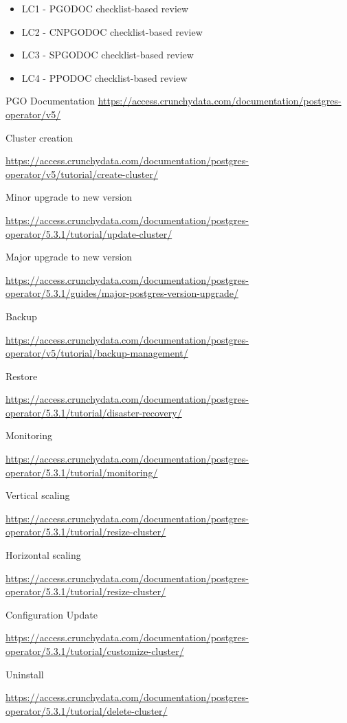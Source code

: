 \begin{itemize}
    \item LC1 - PGODOC checklist-based review
    \item LC2 - CNPGODOC checklist-based review
    \item LC3 - SPGODOC checklist-based review
    \item LC4 - PPODOC checklist-based review
\end{itemize}



PGO
Documentation
\sloppy
\url{https://access.crunchydata.com/documentation/postgres-operator/v5/}

Cluster creation

\url{https://access.crunchydata.com/documentation/postgres-operator/v5/tutorial/create-cluster/}

Minor upgrade to new version

\url{https://access.crunchydata.com/documentation/postgres-operator/5.3.1/tutorial/update-cluster/}

Major upgrade to new version

\url{https://access.crunchydata.com/documentation/postgres-operator/5.3.1/guides/major-postgres-version-upgrade/}

Backup

\url{https://access.crunchydata.com/documentation/postgres-operator/v5/tutorial/backup-management/}

Restore

\url{https://access.crunchydata.com/documentation/postgres-operator/5.3.1/tutorial/disaster-recovery/}

Monitoring

\url{https://access.crunchydata.com/documentation/postgres-operator/5.3.1/tutorial/monitoring/}

Vertical scaling

\url{https://access.crunchydata.com/documentation/postgres-operator/5.3.1/tutorial/resize-cluster/}

Horizontal scaling

\url{https://access.crunchydata.com/documentation/postgres-operator/5.3.1/tutorial/resize-cluster/}

Configuration Update

\url{https://access.crunchydata.com/documentation/postgres-operator/5.3.1/tutorial/customize-cluster/}

Uninstall

\url{https://access.crunchydata.com/documentation/postgres-operator/5.3.1/tutorial/delete-cluster/}

